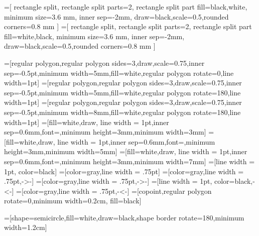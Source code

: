 \usetikzlibrary{shapes.multipart}
\usetikzlibrary{shapes.geometric}




=[
       rectangle split,
       rectangle split parts=2,
       rectangle split part fill={black,white},
 minimum size=3.6 mm, inner sep=-2mm, draw=black,scale=0.5,rounded corners=0.8 mm
       ]
 =[
       rectangle split,
       rectangle split parts=2,
       rectangle split part fill={white,black},
 minimum size=3.6 mm, inner sep=-2mm, draw=black,scale=0.5,rounded corners=0.8 mm
       ]

=[regular polygon,regular polygon sides=3,draw,scale=0.75,inner sep=-0.5pt,minimum width=5mm,fill=white,regular polygon rotate=0,line width=1pt]
=[regular polygon,regular polygon sides=3,draw,scale=0.75,inner sep=-0.5pt,minimum width=5mm,fill=white,regular polygon rotate=180,line width=1pt]
=[regular polygon,regular polygon sides=3,draw,scale=0.75,inner sep=-0.5pt,minimum width=8mm,fill=white,regular polygon rotate=180,line width=1pt]
=[fill=white,draw, line width = 1pt,inner sep=0.6mm,font=\footnotesize,minimum height=3mm,minimum width=3mm]
=[fill=white,draw, line width = 1pt,inner sep=0.6mm,font=\footnotesize,minimum height=3mm,minimum width=5mm]
=[fill=white,draw, line width = 1pt,inner sep=0.6mm,font=\footnotesize,minimum height=3mm,minimum width=7mm]
=[line width = 1pt, color=black]
=[color=gray,line width = .75pt]%
=[color=gray,line width = .75pt,->-]
=[color=gray,line width = .75pt,->-]%
=[line width = 1pt, color=black,-<-]
=[color=gray,line width = .75pt,-<-]%
=[copoint,regular polygon rotate=0,minimum width=0.2cm, fill=black]

=[shape=semicircle,fill=white,draw=black,shape border rotate=180,minimum width=1.2cm]

%
%

